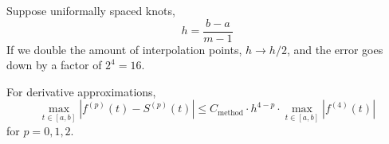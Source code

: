 Suppose uniformally spaced knots, \[
    h = \frac{b - a}{m - 1}
\] If we double the amount of interpolation points, \( h \to h/2 \), and the error goes down by a factor of \( 2^4 = 16 \).

\begin{remark}
    For derivative approximations, \[
        \max_{t \in [a,b]} | f^{(p)}(t) - S^{(p)}(t) | \leq C_{\text{method}} \cdot h^{4-p} \cdot \max_{t \in [a, b]} | f^{(4)}(t) |
    \] for \( p = 0, 1, 2 \).
\end{remark}